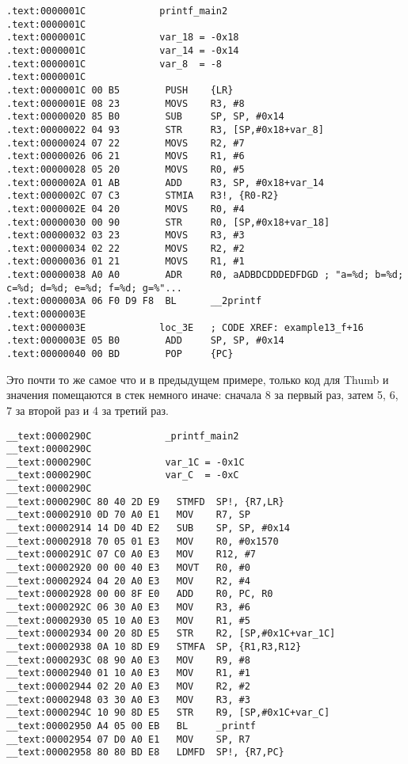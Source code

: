 \begin{lstlisting}
.text:0000001C             printf_main2
.text:0000001C
.text:0000001C             var_18 = -0x18
.text:0000001C             var_14 = -0x14
.text:0000001C             var_8  = -8
.text:0000001C
.text:0000001C 00 B5        PUSH    {LR}
.text:0000001E 08 23        MOVS    R3, #8
.text:00000020 85 B0        SUB     SP, SP, #0x14
.text:00000022 04 93        STR     R3, [SP,#0x18+var_8]
.text:00000024 07 22        MOVS    R2, #7
.text:00000026 06 21        MOVS    R1, #6
.text:00000028 05 20        MOVS    R0, #5
.text:0000002A 01 AB        ADD     R3, SP, #0x18+var_14
.text:0000002C 07 C3        STMIA   R3!, {R0-R2}
.text:0000002E 04 20        MOVS    R0, #4
.text:00000030 00 90        STR     R0, [SP,#0x18+var_18]
.text:00000032 03 23        MOVS    R3, #3
.text:00000034 02 22        MOVS    R2, #2
.text:00000036 01 21        MOVS    R1, #1
.text:00000038 A0 A0        ADR     R0, aADBDCDDDEDFDGD ; "a=%d; b=%d; c=%d; d=%d; e=%d; f=%d; g=%"...
.text:0000003A 06 F0 D9 F8  BL      __2printf
.text:0000003E
.text:0000003E             loc_3E   ; CODE XREF: example13_f+16
.text:0000003E 05 B0        ADD     SP, SP, #0x14
.text:00000040 00 BD        POP     {PC}
\end{lstlisting}

Это почти то же самое что и в предыдущем примере, только код для Thumb и значения помещаются в 
стек немного иначе: сначала 8 за первый раз, затем 5, 6, 7 за второй раз и 4 за третий раз.

\subsubsectionold{\OptimizingXcodeIV: \ARMMode}

\begin{lstlisting}
__text:0000290C             _printf_main2
__text:0000290C
__text:0000290C             var_1C = -0x1C
__text:0000290C             var_C  = -0xC
__text:0000290C
__text:0000290C 80 40 2D E9   STMFD  SP!, {R7,LR}
__text:00002910 0D 70 A0 E1   MOV    R7, SP
__text:00002914 14 D0 4D E2   SUB    SP, SP, #0x14
__text:00002918 70 05 01 E3   MOV    R0, #0x1570
__text:0000291C 07 C0 A0 E3   MOV    R12, #7
__text:00002920 00 00 40 E3   MOVT   R0, #0
__text:00002924 04 20 A0 E3   MOV    R2, #4
__text:00002928 00 00 8F E0   ADD    R0, PC, R0
__text:0000292C 06 30 A0 E3   MOV    R3, #6
__text:00002930 05 10 A0 E3   MOV    R1, #5
__text:00002934 00 20 8D E5   STR    R2, [SP,#0x1C+var_1C]
__text:00002938 0A 10 8D E9   STMFA  SP, {R1,R3,R12}
__text:0000293C 08 90 A0 E3   MOV    R9, #8
__text:00002940 01 10 A0 E3   MOV    R1, #1
__text:00002944 02 20 A0 E3   MOV    R2, #2
__text:00002948 03 30 A0 E3   MOV    R3, #3
__text:0000294C 10 90 8D E5   STR    R9, [SP,#0x1C+var_C]
__text:00002950 A4 05 00 EB   BL     _printf
__text:00002954 07 D0 A0 E1   MOV    SP, R7
__text:00002958 80 80 BD E8   LDMFD  SP!, {R7,PC}
\end{lstlisting}

